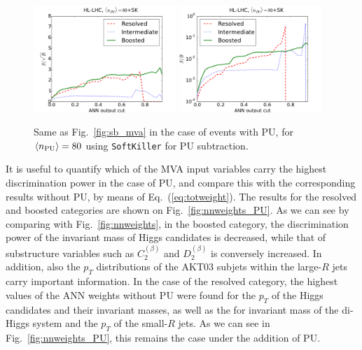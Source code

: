 \begin{figure}[t]
\begin{center}
\includegraphics[width=0.48\textwidth]{plots/ssb_SKPU80.pdf}
\includegraphics[width=0.48\textwidth]{plots/sb_SKPU80.pdf}
\caption{\small 
Same as Fig.~\ref{fig:sb_mva} in the
case of events with PU, for
$\left\langle n_{\rm PU}\right\rangle=80$
using
{\tt SoftKiller} for PU subtraction.
}
\label{fig:sb_mva_PU}
\end{center}
\end{figure}

It is useful to quantify which of the MVA input variables
carry the highest discrimination power
in the case of PU,
and compare this with the corresponding
results without PU, by means of
Eq.~(\ref{eq:totweight}).
%
The 
results for the resolved and boosted categories are shown
on Fig.~\ref{fig:nnweights_PU}.
%
As we can see by comparing with Fig.~\ref{fig:nnweights}, 
in the boosted category, the discrimination power of the invariant
mass of Higgs candidates is decreased, while
that of  substructure
variables such as $C_2^{(\beta)}$ and
$D^{(\beta)}_2$ is conversely
increased.
%
In addition, also the $p_T$ distributions of the AKT03
subjets within the large-$R$
jets carry important information.
%
In the case of the resolved category,  the highest
values of the ANN weights without PU
were found for the $p_T$ of the 
Higgs candidates and their invariant masses, as well
as the for invariant mass of the di-Higgs system
and the $p_T$ of the small-$R$ jets.
%
As we can see in Fig.~\ref{fig:nnweights_PU},
this remains the case under the addition of PU.

